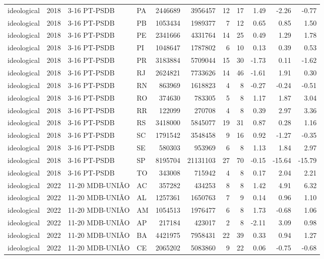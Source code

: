 \begin{landscape}
\begin{longtable}{lllL{1.4cm}rrrrrrr}
ideological & 2018 & 3-16 PT-PSDB & PA & 2446689 & 3956457 & 12 & 17 & 1.49 & -2.26 & -0.77 \\
ideological & 2018 & 3-16 PT-PSDB & PB & 1053434 & 1989377 & 7 & 12 & 0.65 & 0.85 & 1.50 \\
ideological & 2018 & 3-16 PT-PSDB & PE & 2341666 & 4331764 & 14 & 25 & 0.49 & 1.29 & 1.78 \\
ideological & 2018 & 3-16 PT-PSDB & PI & 1048647 & 1787802 & 6 & 10 & 0.13 & 0.39 & 0.53 \\
ideological & 2018 & 3-16 PT-PSDB & PR & 3183884 & 5709044 & 15 & 30 & -1.73 & 0.11 & -1.62 \\
ideological & 2018 & 3-16 PT-PSDB & RJ & 2624821 & 7733626 & 14 & 46 & -1.61 & 1.91 & 0.30 \\
ideological & 2018 & 3-16 PT-PSDB & RN & 863969 & 1618823 & 4 & 8 & -0.27 & -0.24 & -0.51 \\
ideological & 2018 & 3-16 PT-PSDB & RO & 374630 & 783305 & 5 & 8 & 1.17 & 1.87 & 3.04 \\
ideological & 2018 & 3-16 PT-PSDB & RR & 122099 & 270708 & 4 & 8 & 0.39 & 2.97 & 3.36 \\
ideological & 2018 & 3-16 PT-PSDB & RS & 3418000 & 5845077 & 19 & 31 & 0.87 & 0.28 & 1.16 \\
ideological & 2018 & 3-16 PT-PSDB & SC & 1791542 & 3548458 & 9 & 16 & 0.92 & -1.27 & -0.35 \\
ideological & 2018 & 3-16 PT-PSDB & SE & 580303 & 953969 & 6 & 8 & 1.13 & 1.84 & 2.97 \\
ideological & 2018 & 3-16 PT-PSDB & SP & 8195704 & 21131103 & 27 & 70 & -0.15 & -15.64 & -15.79 \\
ideological & 2018 & 3-16 PT-PSDB & TO & 343008 & 715942 & 4 & 8 & 0.17 & 2.04 & 2.21 \\
ideological & 2022 & 11-20 MDB-UNIÃO & AC & 357282 & 434253 & 8 & 8 & 1.42 & 4.91 & 6.32 \\
ideological & 2022 & 11-20 MDB-UNIÃO & AL & 1257361 & 1650763 & 7 & 9 & 0.14 & 0.96 & 1.10 \\
ideological & 2022 & 11-20 MDB-UNIÃO & AM & 1054513 & 1976477 & 6 & 8 & 1.73 & -0.68 & 1.06 \\
ideological & 2022 & 11-20 MDB-UNIÃO & AP & 217184 & 423017 & 2 & 8 & -2.11 & 3.09 & 0.98 \\
ideological & 2022 & 11-20 MDB-UNIÃO & BA & 4421975 & 7958431 & 22 & 39 & 0.33 & 0.94 & 1.27 \\
ideological & 2022 & 11-20 MDB-UNIÃO & CE & 2065202 & 5083860 & 9 & 22 & 0.06 & -0.75 & -0.68 \\

\end{longtable}
\end{landscape}
